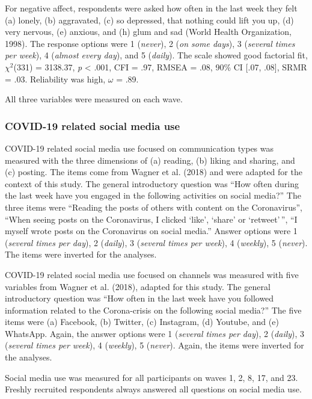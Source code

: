 \documentclass[
  man,mask]{apa6}
\begin{document}
For negative affect, respondents were asked how often in the last week they felt (a) lonely, (b) aggravated, (c) so depressed, that nothing could lift you up, (d) very nervous, (e) anxious, and (h) glum and sad (World Health Organization, 1998).
The response options were 1 (\emph{never}), 2 (\emph{on some days}), 3 (\emph{several times per week}), 4 (\emph{almost every day}), and 5 (\emph{daily}).
The scale showed good factorial fit, \(\chi^2\)(331) = 3138.37, \emph{p} \textless{} .001, CFI = .97, RMSEA = .08, 90\% CI {[}.07, .08{]}, SRMR = .03.
Reliability was high, \(\omega\) = .89.

All three variables were measured on each wave.

\hypertarget{covid-19-related-social-media-use}{%
\subsubsection{COVID-19 related social media use}\label{covid-19-related-social-media-use}}

COVID-19 related social media use focused on communication types was measured with the three dimensions of (a) reading, (b) liking and sharing, and (c) posting.
The items come from Wagner et al. (2018) and were adapted for the context of this study.
The general introductory question was ``How often during the last week have you engaged in the following activities on social media?''
The three items were ``Reading the posts of others with content on the Coronavirus'', ``When seeing posts on the Coronavirus, I clicked `like', `share' or `retweet'\,'', ``I myself wrote posts on the Coronavirus on social media.''
Answer options were 1 (\emph{several times per day}), 2 (\emph{daily}), 3 (\emph{several times per week}), 4 (\emph{weekly}), 5 (\emph{never}).
The items were inverted for the analyses.

COVID-19 related social media use focused on channels was measured with five variables from Wagner et al. (2018), adapted for this study.
The general introductory question was ``How often in the last week have you followed information related to the Corona-crisis on the following social media?''
The five items were (a) Facebook, (b) Twitter, (c) Instagram, (d) Youtube, and (e) WhatsApp.
Again, the answer options were 1 (\emph{several times per day}), 2 (\emph{daily}), 3 (\emph{several times per week}), 4 (\emph{weekly}), 5 (\emph{never}).
Again, the items were inverted for the analyses.

Social media use was measured for all participants on waves 1, 2, 8, 17, and 23.
Freshly recruited respondents always answered all questions on social media use.
\end{document}
